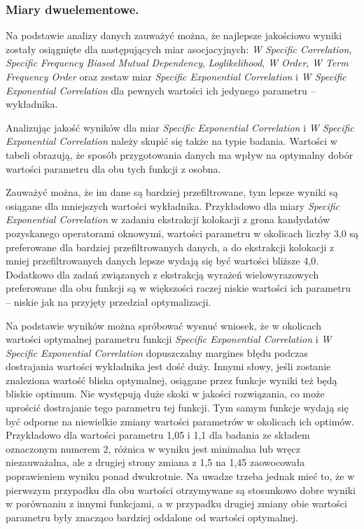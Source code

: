 \documentclass[11pt,a4paper]{llncs}
\begin{document}
\subsubsection{Miary dwuelementowe.}
Na podstawie analizy danych zauważyć można, że najlepsze jakościowo wyniki zostały osiągnięte dla następujących miar asocjacyjnych: \emph{W Specific Correlation}, \emph{Specific Frequency Biased Mutual Dependency}, \emph{Loglikelihood}, \emph{W Order}, \emph{W Term Frequency Order} oraz zestaw miar \emph{Specific Exponential Correlation} i \emph{W Specific Exponential Correlation} dla pewnych wartości ich jedynego parametru -- wykładnika.

\par
Analizując jakość wyników dla miar \emph{Specific Exponential Correlation} i \emph{W Specific Exponential Correlation} należy skupić się także na typie badania.
Wartości w tabeli obrazują, że sposób przygotowania danych ma wpływ na optymalny dobór wartości parametru dla obu tych funkcji z osobna.

\par
Zauważyć można, że im dane są bardziej przefiltrowane, tym lepsze wyniki są osiągane dla mniejszych wartości wykładnika.
Przykładowo dla miary \emph{Specific Exponential Correlation} w zadaniu ekstrakcji kolokacji z grona kandydatów pozyskanego operatorami oknowymi, wartości parametru w okolicach liczby 3,0 są preferowane dla bardziej przefiltrowanych danych, a do ekstrakcji kolokacji z mniej przefiltrowanych danych lepsze wydają się być wartości bliższe 4,0.
Dodatkowo dla zadań związanych z ekstrakcją wyrażeń wielowyrazowych preferowane dla obu funkcji są w większości raczej niskie wartości ich parametru -- niskie jak na przyjęty przedział optymalizacji.

\par
Na podstawie wyników można spróbować wysnuć wniosek, że w okolicach wartości optymalnej parametru funkcji \emph{Specific Exponential Correlation} i \emph{W Specific Exponential Correlation} dopuszczalny margines błędu podczas dostrajania wartości wykładnika jest dość duży.
Innymi słowy, jeśli zostanie znaleziona wartość bliska optymalnej, osiągane przez funkcje wyniki też będą bliskie optimum.
Nie występują duże skoki w jakości rozwiązania, co może uprościć dostrajanie tego parametru tej funkcji.
Tym samym funkcje wydają się być odporne na niewielkie zmiany wartości parametrów w okolicach ich optimów.
Przykładowo dla wartości parametru 1,05 i 1,1 dla badania ze składem oznaczonym numerem 2, różnica w wyniku jest minimalna lub wręcz niezauważalna, ale z drugiej strony zmiana z 1,5 na 1,45 zaowocowała poprawieniem wyniku ponad dwukrotnie.
Na uwadze trzeba jednak mieć to, że w pierwszym przypadku dla obu wartości otrzymywane są stosunkowo dobre wyniki w porównaniu z innymi funkcjami, a w przypadku drugiej zmiany obie wartości parametru były znacząco bardziej oddalone od wartości optymalnej.
\end{document}
